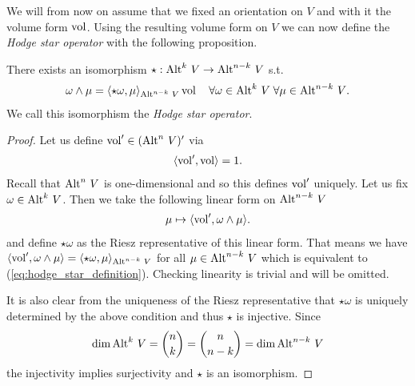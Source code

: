 \documentclass[../master_thesis.tex]{subfiles}
\begin{document}
We will from now on assume that we fixed an orientation on $V$ and with it 
the volume form $\operatorname{vol}$. 
Using the resulting volume form on $V$
we can now define the \textit{Hodge star operator} with the following 
proposition.
\begin{proposition}
    There exists an isomorphism $\star: {\operatorname{Alt}^{k}\,V} 
    \rightarrow {\operatorname{Alt}^{n-k}\,V}$ s.t. 
    \begin{align}
        \omega \wedge \mu = \langle \star \omega, \mu \rangle_{{\operatorname{Alt}^{n-k}\,V}}
        \operatorname{vol} \quad \forall \omega \in {\operatorname{Alt}^{k}\,V} \; \forall \mu \in {\operatorname{Alt}^{n-k}\,V}.
        \label{eq:hodge_star_definition}            
    \end{align}
    We call this isomorphism the \textit{Hodge star operator}.
\end{proposition}
\begin{proof}

    Let us define $\operatorname{vol}' \in ({\operatorname{Alt}^{n}\,V})'$ via 
    \begin{align*}
        \langle \operatorname{vol}', \operatorname{vol} \rangle = 1.
    \end{align*}
    Recall that ${\operatorname{Alt}^{n}\,V}$ is one-dimensional and so this defines $\operatorname{vol}'$ 
    uniquely. Let us fix $\omega \in {\operatorname{Alt}^{k}\,V}$. 
    Then we take the following linear form on $
    {\operatorname{Alt}^{n-k}\,V}$
    \begin{align*}
        \mu \mapsto \langle \operatorname{vol}' ,\omega \wedge \mu \rangle.
    \end{align*}
    and define
    $\star \omega$ as the Riesz representative of this linear form. That means we 
    have $\langle \operatorname{vol}', \omega \wedge \mu \rangle = 
    \langle \star \omega, \mu \rangle_{{\operatorname{Alt}^{n-k}\,V}}$ for all 
    $\mu \in {\operatorname{Alt}^{n-k}\,V}$ which is equivalent to (\ref{eq:hodge_star_definition}).
    Checking linearity is trivial and will be omitted.

    It is also clear from the uniqueness of the Riesz representative that 
    $\star\omega$ is uniquely determined by the above condition and 
    thus $\star$ is injective. Since 
    \begin{align*}
        \dim {\operatorname{Alt}^{k}\,V} = 
        \binom{n}{k} = \binom{n}{n-k} = \dim {\operatorname{Alt}^{n-k}\,V}
    \end{align*}    
    the injectivity 
    implies surjectivity and $\star$ is an isomorphism.
\end{proof}
\end{document}
